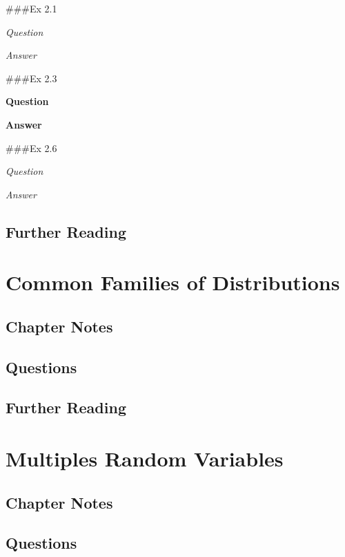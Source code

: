 \documentclass[
]{book}
\begin{document}
\#\#\#Ex 2.1

\emph{Question}

\emph{Answer}

\#\#\#Ex 2.3

\textbf{Question}

\textbf{Answer}

\#\#\#Ex 2.6

\emph{Question}

\emph{Answer}

\hypertarget{further-reading-1}{%
\section*{Further Reading}\label{further-reading-1}}

\hypertarget{families}{%
\chapter{Common Families of Distributions}\label{families}}

\hypertarget{chapter-notes-2}{%
\section{Chapter Notes}\label{chapter-notes-2}}

\hypertarget{questions-2}{%
\section{Questions}\label{questions-2}}

\hypertarget{further-reading-2}{%
\section*{Further Reading}\label{further-reading-2}}

\hypertarget{multiple_variables}{%
\chapter{Multiples Random Variables}\label{multiple_variables}}

\hypertarget{chapter-notes-3}{%
\section{Chapter Notes}\label{chapter-notes-3}}

\hypertarget{questions-3}{%
\section{Questions}\label{questions-3}}
\end{document}
